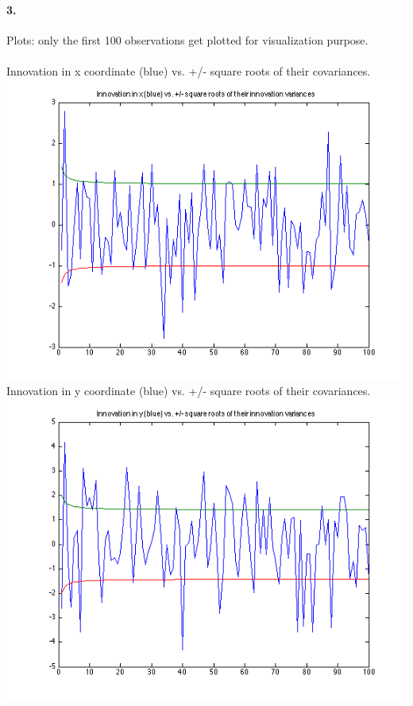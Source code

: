 \documentclass[a4paper]{article}
\begin{document}
\paragraph{3. } Plots: only the first 100 observations get plotted for visualization purpose.\\
\\
Innovation in x coordinate (blue) vs. +/- square roots of their covariances.\\
\includegraphics[scale=.8]{innovation_in_x.png}\\
Innovation in y coordinate (blue) vs. +/- square roots of their covariances.\\
\includegraphics[scale=.8]{innovation_in_y.png}\\
\end{document}
